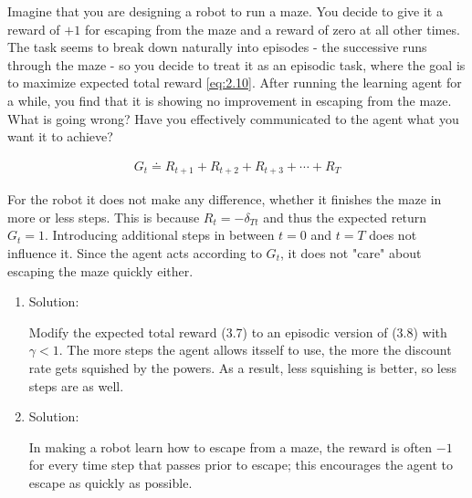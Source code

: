 
\begin{exercise}[Exercise 3.7]

Imagine that you are designing a robot to run a maze.
You decide to give it a reward of $+1$ for escaping from the maze and a reward of zero at all other times.
The task seems to break down naturally into episodes - the successive runs through the maze - so you decide to treat it as an episodic task, where the goal is to maximize expected total reward \eqref{eq:2.10}.
After running the learning agent for a while, you find that it is showing no improvement in escaping from the maze.
What is going wrong?
Have you effectively communicated to the agent what you want it to achieve?

\begin{align} \label{eq:2.10}
    G_t \doteq R_{t+1} + R_{t+2} + R_{t+3} + \cdots + R_T
\end{align}

\end{exercise}


\begin{solution}

For the robot it does not make any difference, whether it finishes the maze in more or less steps.
This is because $R_t = -\delta_{T t}$ and thus the expected return $G_t = 1$.
Introducing additional steps in between $t = 0$ and $t = T$ does not influence it.
Since the agent acts according to $G_t$, it does not "care" about escaping the maze quickly either.

\begin{enumerate}[label = \arabic*.]

    \item Solution:

    Modify the expected total reward (3.7) to an episodic version of (3.8) with $\gamma < 1$.
	The more steps the agent allows itsself to use, the more the discount rate gets squished by the powers.
	As a result, less squishing is better, so less steps are as well.

    \item Solution:

    \begin{displayquote}
        In making a robot learn how to escape from a maze, the reward is often $-1$ for every time step that passes prior to escape; this encourages the agent to escape as quickly as possible.
    \end{displayquote}

\end{enumerate}

\end{solution}

